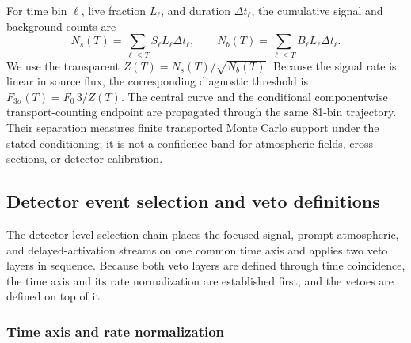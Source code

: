 \documentclass[11pt]{article}
\begin{document}
For time bin $\ell$, live fraction $L_\ell$, and duration $\Delta t_\ell$, the
cumulative signal and background counts are
\begin{equation}
 N_s(T)=\sum_{\ell\leq T} S_\ell L_\ell\Delta t_\ell,
 \qquad
 N_b(T)=\sum_{\ell\leq T} B_\ell L_\ell\Delta t_\ell.
 \label{eq:cumulative_counts}
\end{equation}
We use the transparent  $Z(T)=N_s(T)/\sqrt{N_b(T)}$. Because the
signal rate is linear in source flux, the corresponding diagnostic threshold is
$F_{3\sigma}(T)=F_0\,3/Z(T)$. The central curve and the conditional componentwise
transport-counting endpoint are propagated through the same 81-bin trajectory.
Their separation measures finite transported Monte Carlo support under the stated
conditioning; it is not a confidence band for atmospheric fields, cross sections,
or detector calibration.

\subsection{Detector event selection and veto definitions}
\label{sec:selection}

The detector-level selection chain places the focused-signal, prompt
atmospheric, and delayed-activation streams on one common time axis and applies
two veto layers in sequence. Because both veto layers are defined through time
coincidence, the time axis and its rate normalization are established first, and
the vetoes are defined on top of it.

\subsubsection{Time axis and rate normalization}
\end{document}
